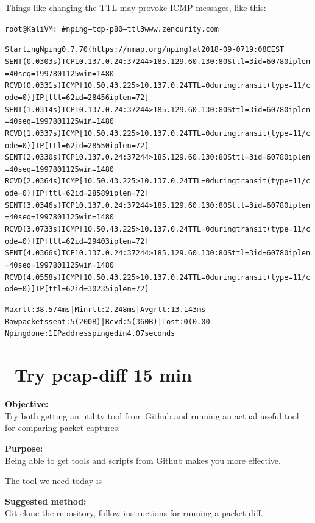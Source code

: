 \documentclass[a4paper,11pt,notitlepage]{report}
\begin{document}
\eject
Things like changing the TTL may provoke ICMP messages, like this:
\begin{alltt}\footnotesize
root@KaliVM:~# nping --tcp -p 80 --ttl 3 www.zencurity.com

Starting Nping 0.7.70 ( https://nmap.org/nping ) at 2018-09-07 19:08 CEST
SENT (0.0303s) TCP 10.137.0.24:37244 > 185.129.60.130:80 S ttl=3 id=60780 iplen=40  seq=1997801125 win=1480
RCVD (0.0331s) ICMP [10.50.43.225 > 10.137.0.24 TTL=0 during transit (type=11/code=0) ] IP [ttl=62 id=28456 iplen=72 ]
SENT (1.0314s) TCP 10.137.0.24:37244 > 185.129.60.130:80 S ttl=3 id=60780 iplen=40  seq=1997801125 win=1480
RCVD (1.0337s) ICMP [10.50.43.225 > 10.137.0.24 TTL=0 during transit (type=11/code=0) ] IP [ttl=62 id=28550 iplen=72 ]
SENT (2.0330s) TCP 10.137.0.24:37244 > 185.129.60.130:80 S ttl=3 id=60780 iplen=40  seq=1997801125 win=1480
RCVD (2.0364s) ICMP [10.50.43.225 > 10.137.0.24 TTL=0 during transit (type=11/code=0) ] IP [ttl=62 id=28589 iplen=72 ]
SENT (3.0346s) TCP 10.137.0.24:37244 > 185.129.60.130:80 S ttl=3 id=60780 iplen=40  seq=1997801125 win=1480
RCVD (3.0733s) ICMP [10.50.43.225 > 10.137.0.24 TTL=0 during transit (type=11/code=0) ] IP [ttl=62 id=29403 iplen=72 ]
SENT (4.0366s) TCP 10.137.0.24:37244 > 185.129.60.130:80 S ttl=3 id=60780 iplen=40  seq=1997801125 win=1480
RCVD (4.0558s) ICMP [10.50.43.225 > 10.137.0.24 TTL=0 during transit (type=11/code=0) ] IP [ttl=62 id=30235 iplen=72 ]

Max rtt: 38.574ms | Min rtt: 2.248ms | Avg rtt: 13.143ms
Raw packets sent: 5 (200B) | Rcvd: 5 (360B) | Lost: 0 (0.00%
Nping done: 1 IP address pinged in 4.07 seconds
\end{alltt}


\chapter{\faInfoCircle\ Try pcap-diff 15 min}
\label{ex:pcap-diff}

{\bf Objective:}\\
Try both getting an utility tool from Github and running an actual useful tool for comparing packet captures.

{\bf Purpose:}\\
Being able to get tools and scripts from Github makes you more effective.

The tool we need today is 

{\bf Suggested method:}\\
Git clone the repository, follow instructions for running a packet diff.
\end{document}

